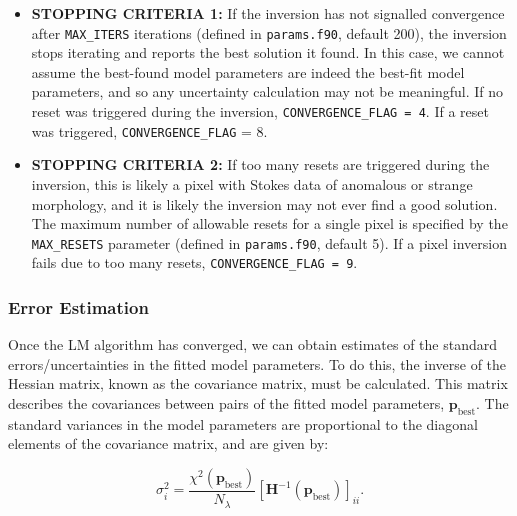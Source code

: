 \documentclass[11pt]{article}
\begin{document}
\begin{itemize}
  \renewcommand\labelitemi{\scriptsize$\blacksquare$}
  \item \textbf{STOPPING CRITERIA 1:} If the inversion has not signalled convergence after \texttt{MAX\_ITERS} iterations
        (defined in \texttt{params.f90}, default 200), the inversion stops iterating and reports the best solution it
        found.  In this case, we cannot assume the best-found model parameters are indeed the best-fit model
        parameters, and so any uncertainty calculation may not be meaningful.  If no reset was triggered during
        the inversion, \texttt{CONVERGENCE\_FLAG = 4}.  If a reset was triggered, \texttt{CONVERGENCE\_FLAG} = 8.
  \item \textbf{STOPPING CRITERIA 2:} If too many resets are triggered during the inversion, this is likely 
        a pixel with Stokes data of anomalous or strange morphology, and it is likely the inversion may not
        ever find a good solution.  The maximum number of allowable resets for a single pixel is specified by
        the \texttt{MAX\_RESETS} parameter (defined in \texttt{params.f90}, default 5).  If a pixel inversion fails
        due to too many resets, \texttt{CONVERGENCE\_FLAG = 9}.
\end{itemize}



\subsubsection{Error Estimation}\label{ss:errors}
Once the LM algorithm has converged, we can obtain estimates of the standard errors/uncertainties in the 
fitted model parameters.  To do this, the inverse of the Hessian matrix, known as the covariance matrix,
must be calculated.  This matrix describes the covariances between pairs of the fitted model parameters,
$\mathbf{p}_{\mathrm{best}}$.  The standard variances in the model parameters are proportional to the
diagonal elements of the covariance matrix, and are given by:

\begin{equation}
\sigma_{i}^{2} = \frac{\chi^{2}(\mathbf{p}_{\mathrm{best}})}{N_{\lambda}}\left[\mathbf{H}^{-1}(\mathbf{p}_{\mathrm{best}})\right]_{ii}.
\end{equation}
\end{document}
